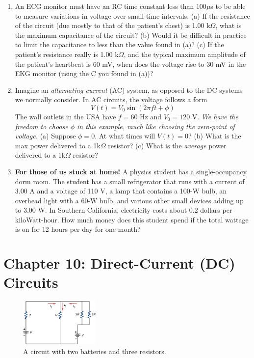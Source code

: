 \documentclass[10pt]{article}
\begin{document}
\begin{enumerate}
\item An ECG monitor must have an RC time constant less than $100 \mu$s to be able to measure variations in voltage over small time intervals. (a) If the resistance of the circuit (due mostly to that of the patient’s chest) is 1.00 k$\Omega$, what is the maximum capacitance of the circuit? (b) Would it be difficult in practice to limit the capacitance to less than the value found in (a)?  (c) If the patient's resistance really is 1.00 k$\Omega$, and the typical maximum amplitude of the patient's heartbeat is 60 mV, when does the voltage rise to 30 mV in the EKG monitor (using the C you found in (a))? \\ \vspace{3cm}
\item Imagine an \textit{alternating current} (AC) system, as opposed to the DC systems we normally consider.  In AC circuits, the voltage follows a form
\begin{equation}
V(t) = V_0 \sin(2\pi f t + \phi)
\end{equation}
The wall outlets in the USA have $f = 60$ Hz and $V_0 = 120$ V.  \textit{We have the freedom to choose $\phi$ in this example, much like choosing the zero-point of voltage.}  (a) Suppose $\phi = 0$.  At what times will $V(t) = 0$? (b) What is the max power delivered to a 1k$\Omega$ resistor? (c) What is the \textit{average} power delivered to a 1k$\Omega$ resistor?  \\ \vspace{3cm} 
\item \textbf{For those of us stuck at home!} A physics student has a single-occupancy dorm room. The student has a small refrigerator that runs with a current of 3.00 A and a voltage of 110 V, a lamp that contains a 100-W bulb, an overhead light with a 60-W bulb, and various other small devices adding up to 3.00 W.  In Southern California, electricity costs about 0.2 dollars per kiloWatt-hour.  How much money does this student spend if the total wattage is on for 12 hours per day for one month? \\ \vspace{2cm}
\end{enumerate}

\section{Chapter 10: Direct-Current (DC) Circuits}

\begin{figure}[ht]
\centering
\includegraphics[width=0.35\textwidth]{complexCircuit.jpeg}
\caption{\label{fig:circuit1} A circuit with two batteries and three resistors.}
\end{figure}
\end{document}
